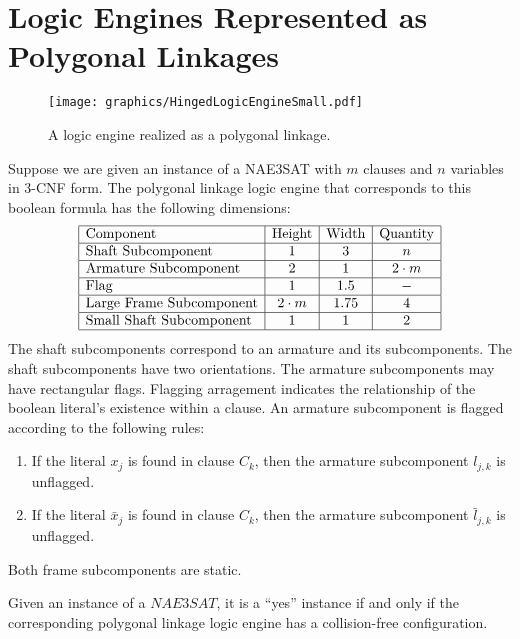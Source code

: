 


\section{Logic Engines Represented as Polygonal Linkages}         
\begin{figure}[!htbp]
\begin{center}
\texttt{[image: graphics/HingedLogicEngineSmall.pdf]}
\caption{A logic engine realized as a polygonal linkage.}\label{fig:HingedLogicEngineSmall.pdf}
\end{center}
\end{figure}
Suppose we are given an instance of a NAE3SAT with $m$ clauses and $n$ variables in 3-CNF form.  
The polygonal linkage logic engine that corresponds to this boolean formula has the following 
dimensions:
$$\begin{array}{|l|c|c|c|}%
 \hline
 \text{Component} & \text{Height} & \text{Width} & \text{Quantity}\\\hline
 \text{Shaft Subcomponent} & 1 & 3 & n\\\hline
 \text{Armature Subcomponent} & 2 & 1 & 2\cdot m\\\hline
 \text{Flag} & 1 & 1.5 & -\\\hline
 \text{Large Frame Subcomponent} & 2\cdot m & 1.75 & 4\\\hline
 \text{Small Shaft Subcomponent} & 1 & 1 & 2\\\hline
\end{array}$$
The shaft subcomponents correspond to an armature and its subcomponents. The shaft subcomponents 
have two orientations.  The armature subcomponents may have rectangular flags. Flagging arragement 
indicates the relationship of the boolean literal's existence within a clause.   An armature 
subcomponent is flagged according to the following rules:
\begin{enumerate}
 \item If the literal $x_j$ is found in clause $C_k$, then the armature subcomponent $l_{j,k}$ is 
unflagged.
 \item If the literal $\bar{x}_j$ is found in clause $C_k$, then the armature 
subcomponent $\bar{l}_{j,k}$ is unflagged.
\end{enumerate}
Both frame subcomponents are static.  
\begin{thm}\label{thm:Satisfiability-1}
 Given an instance of a $NAE3SAT$,  it is a ``yes'' instance if and only if the 
corresponding polygonal linkage logic engine has a collision-free configuration.  
\end{thm}

